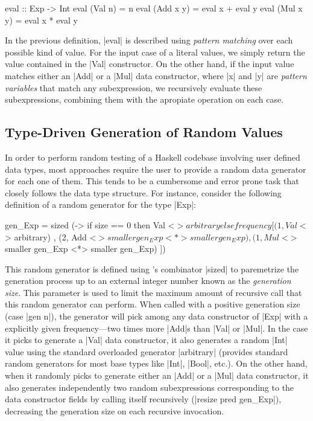 \begin{code}
eval :: Exp -> Int
eval (Val n)    = n
eval (Add x y)  = eval x  +  eval y
eval (Mul x y)  = eval x  *  eval y
\end{code}

In the previous definition, |eval| is described using \emph{pattern matching}
over each possible kind of value.
%
For the input case of a literal values, we simply return the value contained in
the |Val| constructor.
%
On the other hand, if the input value matches either an |Add| or a |Mul| data
constructor, where |x| and |y| are \emph{pattern variables} that match any
subexpression, we recursively evaluate these subexpressions, combining them with
the apropiate operation on each case.

\subsection*{\textbf{Type-Driven Generation of Random Values}}

In order to perform random testing of a Haskell codebase involving user defined
data types, most approaches require the user to provide a random data generator
for each one of them.
%
This tends to be a cumbersome and error prone task that closely follows the data
type structure.
%
For instance, consider the following definition of a \quickcheck random
generator for the type |Exp|:

\begin{code}
gen_Exp = sized (\size ->
   if size == 0
   then Val <$> arbitrary
   else frequency
     [  (1, Val  <$> arbitrary)
     ,  (2, Add  <$> smaller gen_Exp <*> smaller gen_Exp)
     ,  (1, Mul  <$> smaller gen_Exp <*> smaller gen_Exp) ])
\end{code} %

This random generator is defined using \quickcheck's combinator |sized| to
paremetrize the generation process up to an external integer number known as the
\emph{generation size}.
%
This parameter is used to limit the maximum amount of recursive call that this
random generator can perform.
%
When called with a positive generation size (case |gen n|), the generator will
pick among any data constructor of |Exp| with a explicitly given frequency---two
times more |Add|s than |Val| or |Mul|.
%
In the case it picks to generate a |Val| data constructor, it also generates a
random |Int| value using the standard overloaded generator |arbitrary|
(\quickcheck provides standard random generators for most base types like |Int|,
|Bool|, etc.).
%
On the other hand, when it randomly picks to generate either an |Add| or a |Mul|
data constructor, it also generates independently two random subexpressions
corresponding to the data constructor fields by calling itself recursively
(|resize pred gen_Exp|), decreasing the generation size on each recursive
invocation.



